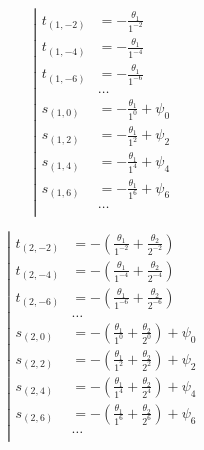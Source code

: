 \begin{equation*} \left| \begin{aligned}
t_{(1,-2)} &=
- \frac{\theta_1}{1^{-2}} \\
%
t_{(1,-4)} &=
- \frac{\theta_1}{1^{-4}} \\
%
t_{(1,-6)} &=
- \frac{\theta_1}{1^{-6}} \\
%
&\ldots \\
%
s_{(1,0)} &=
- \frac{\theta_1}{1^0}
+ \psi_0 \\
%
s_{(1,2)} &=
- \frac{\theta_1}{1^2}
+ \psi_2 \\
%
s_{(1,4)} &=
- \frac{\theta_1}{1^4}
+ \psi_4 \\
%
s_{(1,6)} &=
- \frac{\theta_1}{1^6}
+ \psi_6 \\
%
&\ldots \\
\end{aligned} \right. \end{equation*}

\begin{equation*} \left| \begin{aligned}
t_{(2,-2)} &=
- \left(
  \frac{\theta_1}{1^{-2}}
+ \frac{\theta_2}{2^{-2}} \right) \\
%
t_{(2,-4)} &=
- \left(
  \frac{\theta_1}{1^{-4}}
+ \frac{\theta_2}{2^{-4}} \right) \\
%
t_{(2,-6)} &=
- \left(
  \frac{\theta_1}{1^{-6}}
+ \frac{\theta_2}{2^{-6}} \right) \\
%
&\ldots \\
%
s_{(2,0)} &=
- \left(
  \frac{\theta_1}{1^0}
+ \frac{\theta_2}{2^0} \right)
+ \psi_0 \\
%
s_{(2,2)} &=
- \left(
  \frac{\theta_1}{1^2}
+ \frac{\theta_2}{2^2} \right)
+ \psi_2 \\
%
s_{(2,4)} &=
- \left(
  \frac{\theta_1}{1^4}
+ \frac{\theta_2}{2^4} \right)
+ \psi_4 \\
%
s_{(2,6)} &=
- \left(
  \frac{\theta_1}{1^6}
+ \frac{\theta_2}{2^6} \right)
+ \psi_6 \\
%
&\ldots \\
\end{aligned} \right. \end{equation*}

